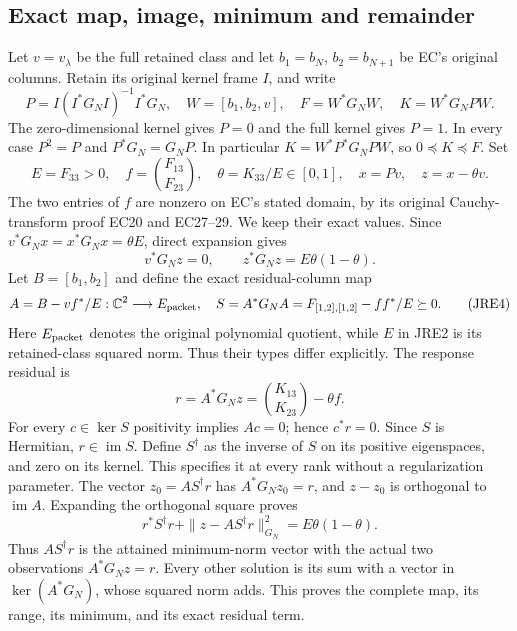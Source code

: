 \documentclass[11pt,a4paper]{article}
\begin{document}
\subsection{Exact map, image, minimum and remainder}
Let $v=v_\lambda$ be the full retained class and let
$b_1=b_N$, $b_2=b_{N+1}$ be EC's original columns. Retain its original
kernel frame $I$, and write
\[
 P=I(I^*G_NI)^{-1}I^*G_N,\quad
 W=[b_1,b_2,v],\quad F=W^*G_NW,\quad K=W^*G_NPW .                 \tag{JRE1}
\]
The zero-dimensional kernel gives $P=0$ and the full kernel gives $P=1$.
In every case $P^2=P$ and $P^*G_N=G_NP$. In particular
$K=W^*P^*G_NPW$, so $0\preceq K\preceq F$.
Set
\[
 E=F_{33}>0,\quad f=\binom{F_{13}}{F_{23}},\quad
 \theta=K_{33}/E\in[0,1],\quad
 x=Pv,\quad z=x-\theta v .                                    \tag{JRE2}
\]
The two entries of $f$ are nonzero on EC's stated domain, by its original
Cauchy-transform proof EC20 and EC27--29. We keep their exact values.
Since $v^*G_Nx=x^*G_Nx=\theta E$, direct expansion gives
\[
 v^*G_Nz=0,\qquad z^*G_Nz=E\theta(1-\theta).                   \tag{JRE3}
\]
Let $B=[b_1,b_2]$ and define the exact residual-column map
\[
 A=B-vf^*/E:\mathbb C^2\longrightarrow E_{\rm packet},\quad
 S=A^*G_NA=F_{[1,2],[1,2]}-ff^*/E\succeq0 .                    \tag{JRE4}
\]
Here $E_{\rm packet}$ denotes the original polynomial quotient, while
$E$ in JRE2 is its retained-class squared norm. Thus their types differ
explicitly. The response residual is
\[
 r=A^*G_Nz=\binom{K_{13}}{K_{23}}-\theta f .                    \tag{JRE5}
\]
For every $c\in\ker S$ positivity implies $Ac=0$; hence $c^*r=0$.
Since $S$ is Hermitian, $r\in\operatorname{im}S$.
Define $S^\dagger$ as the inverse of $S$ on its positive eigenspaces,
and zero on its kernel. This specifies it at every rank without a
regularization parameter. The vector
$z_0=AS^\dagger r$ has $A^*G_Nz_0=r$, and $z-z_0$ is orthogonal to
$\operatorname{im}A$. Expanding the orthogonal square proves
\[
 \boxed{r^*S^\dagger r+
       \|z-AS^\dagger r\|_{G_N}^{2}=E\theta(1-\theta).}       \tag{JRE6}
\]
Thus $AS^\dagger r$ is the attained minimum-norm vector with the actual
two observations $A^*G_Nz=r$. Every other solution is its sum with a
vector in $\ker(A^*G_N)$, whose squared norm adds. This proves the
complete map, its range, its minimum, and its exact residual term.
\end{document}
